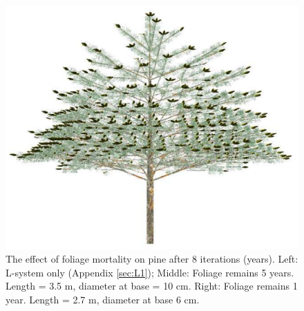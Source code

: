 \begin{figure}
\includegraphics[scale=0.20]{pine8F1}   
\caption{The effect of foliage mortality on pine after 8 iterations (years). 
  Left: L-system only (Appendix \ref{sec:L1}); Middle: Foliage remains
  5 years.  Length = 3.5 m,  diameter at base = 10 cm.  Right: Foliage
  remains 1 year. Length = 2.7 m, diameter at base 6 cm.}
         \label{fig:pine}
\end{figure}

